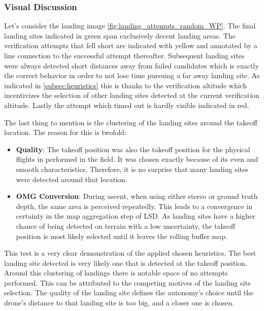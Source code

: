    \subsubsection{Visual Discussion}
    Let's consider the landing image \ref{fig:landing_attempts_random_WP}. The final landing sites indicated in green span exclusively decent landing areas. The verification attempts that fell short are indicated with yellow and annotated by a line connection to the successful attempt thereafter. Subsequent landing sites were always detected short distances away from failed candidates which is exactly the correct behavior in order to not lose time pursuing a far away landing site. As indicated in \cref{subsec:heuristics} this is thanks to the verification altitude which incentivizes the selection of other landing sites detected at the current verification altitude. Lastly the attempt which timed out is hardly visible indicated in red. %

    The last thing to mention is the clustering of the landing sites around the takeoff location. The reason for this is twofold:
    \begin{itemize}
        \item \textbf{Quality}: The takeoff position was also the takeoff position for the physical flights in performed in the field. It was chosen exactly because of its even and smooth characteristics. Therefore, it is no surprise that many landing sites were detected around that location.
        \item \textbf{OMG Conversion}: During ascent, when using either stereo or ground truth depth, the same area is perceived repeatedly. This leads to a convergence in certainty in the map aggregation step of LSD. As landing sites have a higher chance of being detected on terrain with a low uncertainty, the takeoff position is most likely selected until it leaves the rolling buffer map.
    \end{itemize}

    This test is a very clear demonstration of the applied chosen heuristics. The best landing site detected is very likely one that is detected at the takeoff position. Around this clustering of landings there is notable space of no attempts performed. This can be attributed to the competing motives of the landing site selection. The quality of the landing site defines the autonomy's choice until the drone's distance to that landing site is too big, and a closer one is chosen. 

